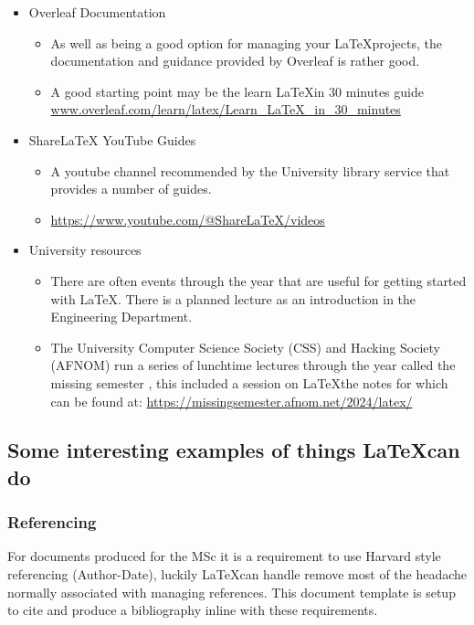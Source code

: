 \begin{itemize}
    \item Overleaf Documentation \parencite{overleaf-documentation}
        \begin{itemize}
            \item As well as being a good option for managing your \LaTeX projects, the documentation and guidance provided by Overleaf is rather good.
            \item A good starting point may be the learn \LaTeX in 30 minutes guide \url{www.overleaf.com/learn/latex/Learn_LaTeX_in_30_minutes}
        \end{itemize}
    \item ShareLaTeX YouTube Guides \parencite{youtube-sharelatex-channel}
        \begin{itemize}
            \item A youtube channel recommended by the University library service that provides a number of guides.
            \item \url{https://www.youtube.com/@ShareLaTeX/videos}
        \end{itemize}
    \item University resources
        \begin{itemize}
            \item There are often events through the year that are useful for getting started with LaTeX. There is a planned lecture as an introduction in the Engineering Department.
            \item The University Computer Science Society (CSS) and Hacking Society (AFNOM)  run a series of lunchtime lectures through the year called the missing semester \parencite{missing-semester}, this included a session on \LaTeX  the notes for which can be found at:  \url{https://missingsemester.afnom.net/2024/latex/}
        \end{itemize}
\end{itemize}

\subsection{Some interesting examples of things \LaTeX can do}

\subsubsection{Referencing}
For documents produced for the MSc it is a requirement to use Harvard style referencing (Author-Date), luckily \LaTeX can handle remove most of the headache normally associated with managing references. This document template is setup to cite and produce a bibliography inline with these requirements.

